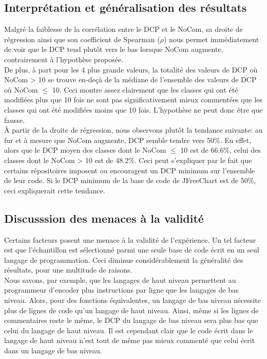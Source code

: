 \documentclass{article}
\begin{document}
\subsection{Interprétation et généralisation des résultats}
Malgré la faiblesse de la corrélation entre le DCP et le NoCom, sa droite de régression ainsi que son coefficient de Spearman ($\rho$)
nous permet immédiatement de voir que le DCP tend plutôt vers le bas lorsque NoCom augmente, contrairement à l'hypothèse proposée.\vspace{0.5em}
\\
De plus, à part pour les 4 plus grande valeurs, la totalité des valeurs de DCP où NoCom > 10 se trouve en-deçà de la médiane de l'ensemble des valeurs de DCP où NoCom $\leq$ 10.
Ceci montre assez clairement que les classes qui ont été modifiées plus que 10 fois ne sont pas significativement mieux commentées
que les classes qui ont été modifiées moins que 10 fois. L'hypothèse ne peut donc être que fausse.\vspace{0.5em}
\\
À partir de la droite de régression, nous observons plutôt la tendance suivante: au fur et à mesure que NoCom augmente, DCP semble tendre vers 50\%.
En effet, alors que le DCP moyen des classes dont le NoCom $\leq$ 10 est de 66.6\%, celui des classes dont le NoCom > 10 est de 48.2\%.
Ceci peut s'expliquer par le fait que certains répositoires imposent ou encouragent un DCP minimum sur l'ensemble de leur code.
Si le DCP minimum de la base de code de JFreeChart est de 50\%, ceci expliquerait cette tendance.\vspace{0.5em}

\subsection{Discusssion des menaces à la validité}
Certains facteurs posent une menace à la validité de l’expérience.
Un tel facteur est que l’échantillon est sélectionné parmi une seule base de code écrit en un seul langage de programmation.
Ceci diminue considérablement la généralité des résultats, pour une multitude de raisons.\vspace{0.5em}
\\
Nous savons, par exemple, que les langages de haut niveau permettent au programmeur d'encoder plus instructions par ligne que les langages de bas niveau.
Alors, pour des fonctions équivalentes, un langage de bas niveau nécessite plus de lignes de code qu'un langage de haut niveau.
Ainsi, même si les lignes de commentaires reste le même, le DCP du langage de bas niveau sera plus bas que celui du langage de haut niveau.
Il est cependant clair que le code écrit dans le langage de haut niveau n'est tout de même pas mieux commenté que celui écrit dans un langage de bas niveau.
\end{document}
